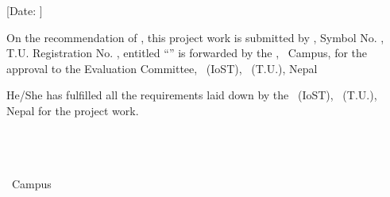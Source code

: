 
[Date: \SubmissionDateNumeric]

\vspace{\baselineskip}

On the recommendation of \textbf{\SupervisorName}, this project work is submitted by \textbf{\ReportAuthor}, Symbol No. \SymbolNumber, T.U. Registration No. \RegistrationNumber, entitled ``\textbf{\ReportTitle}'' is forwarded by the \DepartmentName, \CampusName\ Campus, for the approval to the Evaluation Committee, \InstituteName\ (IoST), \UniversityName\ (T.U.), Nepal

He/She has fulfilled all the requirements laid down by the \InstituteName\ (IoST), \UniversityName\ (T.U.), Nepal for the project work.

\vspace{3\baselineskip}
\DashedSignatureLine{5cm}\\
\HeadOfDepartment \\
\HeadOfDepartmentTitle\\
\CampusName\ Campus\\
\UniversityName
